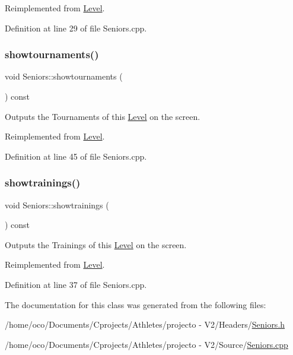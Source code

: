 Reimplemented from \hyperlink{class_level_a40d22b376e72950a07de5e0a9e288029}{Level}.



Definition at line 29 of file Seniors.\+cpp.

\hypertarget{class_seniors_a5782adf80e1221220aa9e7bcaca5a3e3}{}\label{class_seniors_a5782adf80e1221220aa9e7bcaca5a3e3} 
\subsubsection{\texorpdfstring{showtournaments()}{showtournaments()}}
{\footnotesize\ttfamily void Seniors\+::showtournaments (\begin{DoxyParamCaption}{ }\end{DoxyParamCaption}) const\hspace{0.3cm}{\ttfamily [virtual]}}



Outputs the Tournaments of this \hyperlink{class_level}{Level} on the screen. 



Reimplemented from \hyperlink{class_level_a757c4547f3b8f7c7ecb02c7e0e6cd7c9}{Level}.



Definition at line 45 of file Seniors.\+cpp.

\hypertarget{class_seniors_a1f993a8ff143cc2e6dee8f3c81ed4cf3}{}\label{class_seniors_a1f993a8ff143cc2e6dee8f3c81ed4cf3} 
\subsubsection{\texorpdfstring{showtrainings()}{showtrainings()}}
{\footnotesize\ttfamily void Seniors\+::showtrainings (\begin{DoxyParamCaption}{ }\end{DoxyParamCaption}) const\hspace{0.3cm}{\ttfamily [virtual]}}



Outputs the Trainings of this \hyperlink{class_level}{Level} on the screen. 



Reimplemented from \hyperlink{class_level_a4101cb725b1fd0c0836834c92b190363}{Level}.



Definition at line 37 of file Seniors.\+cpp.



The documentation for this class was generated from the following files\+:\begin{DoxyCompactItemize}
\item 
/home/oco/\+Documents/\+Cprojects/\+Athletes/projecto -\/ V2/\+Headers/\hyperlink{_seniors_8h}{Seniors.\+h}\item 
/home/oco/\+Documents/\+Cprojects/\+Athletes/projecto -\/ V2/\+Source/\hyperlink{_seniors_8cpp}{Seniors.\+cpp}\end{DoxyCompactItemize}
